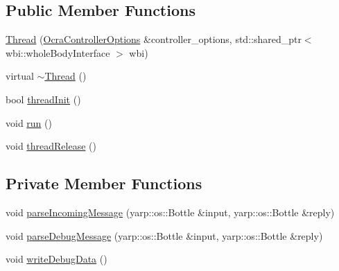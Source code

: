 \subsection*{Public Member Functions}
\begin{DoxyCompactItemize}
\item 
\hyperlink{classThread_a7494a3cf676527432ee724d59ed9ee8f}{Thread} (\hyperlink{classOcraControllerOptions}{Ocra\+Controller\+Options} \&controller\+\_\+options, std\+::shared\+\_\+ptr$<$ wbi\+::whole\+Body\+Interface $>$ wbi)
\item 
virtual \hyperlink{classThread_a37d9edd3a1a776cbc27dedff949c9726}{$\sim$\+Thread} ()
\item 
bool \hyperlink{classThread_a1e840470cd71d7bfb2430d24169e3dce}{thread\+Init} ()
\item 
void \hyperlink{classThread_ad9373d8d725c46717dfce3130018fe3a}{run} ()
\item 
void \hyperlink{classThread_aa2856c7d45670f45d66bcb319255defe}{thread\+Release} ()
\end{DoxyCompactItemize}
\subsection*{Private Member Functions}
\begin{DoxyCompactItemize}
\item 
void \hyperlink{classThread_ae21029d250ac7c720f2411eab71a9414}{parse\+Incoming\+Message} (yarp\+::os\+::\+Bottle \&input, yarp\+::os\+::\+Bottle \&reply)
\item 
void \hyperlink{classThread_a6ce5ef9684cb2793be85e7402ad672f0}{parse\+Debug\+Message} (yarp\+::os\+::\+Bottle \&input, yarp\+::os\+::\+Bottle \&reply)
\item 
void \hyperlink{classThread_a9af0e98aa9b1de2f5c7bfa2f6e5001a2}{write\+Debug\+Data} ()
\end{DoxyCompactItemize}
